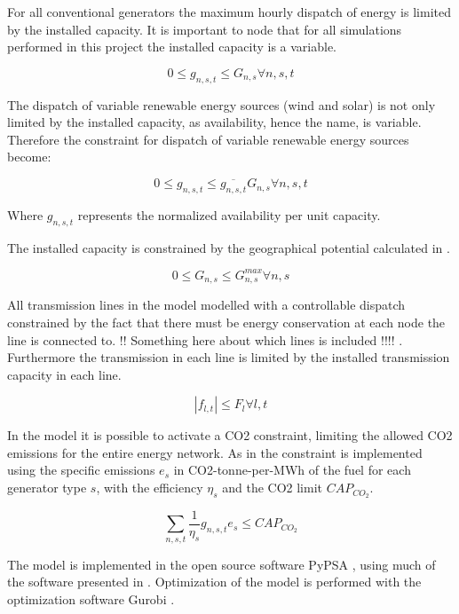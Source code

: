 For all conventional generators the maximum hourly dispatch of energy is limited by the installed capacity. It is important to node that for all simulations performed in this project the installed capacity is a variable. 

\begin{equation}
0\leq g_{n,s,t} \leq G_{n,s} \forall n,s,t
\end{equation}

The dispatch of variable renewable energy sources (wind and solar) is not only limited by the installed capacity, as availability, hence the name, is variable. Therefore the constraint for dispatch of variable renewable energy sources become:

\begin{equation}
0 \leq g_{n,s,t} \leq \overline{g_{n,s,t}} G_{n,s} \forall n,s,t
\end{equation}

Where $g_{n,s,t}$ represents the normalized availability per unit capacity. 

The installed capacity is constrained by the geographical potential calculated in \cite{PypsaModel}.

\begin{equation}
0 \leq G_{n,s} \leq G_{n,s}^{max} \forall n,s
\end{equation}

All transmission lines in the model modelled with a controllable dispatch constrained by the fact that there must be energy conservation at each node the line is connected to. !! Something here about which lines is included !!!! . Furthermore the transmission in each line is limited by the installed transmission capacity in each line. 

\begin{equation}
|f_{l,t}| \leq F_l \forall l,t
\end{equation}

In the model it is possible to activate a CO2 constraint, limiting the allowed CO2 emissions for the entire energy network. As in \cite{PypsaModel} the constraint is implemented using the specific emissions $e_s$ in CO2-tonne-per-MWh of the fuel for each generator type $s$, with the efficiency $\eta_s$ and the CO2 limit $CAP_{CO_2}$. 

\begin{equation}
\sum_{n,s,t} \frac{1}{\eta_s}g_{n,s,t} e_s \leq CAP_{CO_2}
\end{equation}

The model is implemented in the open source software PyPSA \cite{Pypsa}, using much of the software presented in \cite{PypsaModel}. Optimization of the model is performed with the optimization software Gurobi \cite{Gurobi}. 

